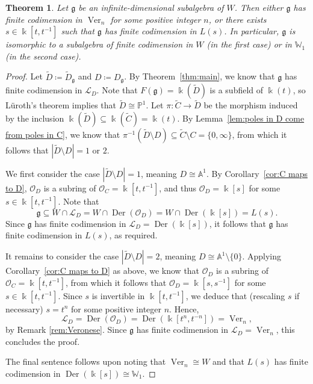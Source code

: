 \documentclass[12pt]{amsart}
\theoremstyle{plain}
\newtheorem{theorem}{Theorem}[section]
\theoremstyle{definition}
\numberwithin{equation}{section}
\def\g{\mathfrak{g}}
\def\L{\mathcal{L}}
\def\O{\mathcal{O}}
\def\Aa{\mathbb{A}}
\def\PP{\mathbb{P}}
\def\WW{\mathbb{W}}
\def\kk{\Bbbk}
\DeclareMathOperator{\Der}{Der}
\DeclareMathOperator{\Ver}{Ver}
\begin{document}
\begin{theorem}\label{thm:classification up to finite codimension}
    Let $\g$ be an infinite-dimensional subalgebra of $W$. Then either $\g$ has finite codimension in $\Ver_n$ for some positive integer $n$, or there exists $s \in \kk[t,t^{-1}]$ such that $\g$ has finite codimension in $L(s)$. In particular, $\g$ is isomorphic to a subalgebra of finite codimension in $W$ (in the first case) or in $\WW_1$ (in the second case).
\end{theorem}
\begin{proof}
    Let $\widetilde{D} \coloneqq \widetilde{D}_\g$ and $D \coloneqq D_\g$. By Theorem~\ref{thm:main}, we know that $\g$ has finite codimension in $\L_D$. Note that $F(\g) = \kk(\widetilde{D})$ is a subfield of $\kk(t)$, so L\"uroth's theorem implies that $\widetilde{D} \cong \PP^1$. Let $\pi \colon \widetilde{C} \to \widetilde{D}$ be the morphism induced by the inclusion $\kk(\widetilde{D}) \subseteq \kk(\widetilde{C}) = \kk(t)$. By Lemma~\ref{lem:poles in D come from poles in C}, we know that $\pi^{-1}(\widetilde{D} \setminus D) \subseteq \widetilde{C} \setminus C = \{0,\infty\}$, from which it follows that $|\widetilde{D} \setminus D| = 1$ or $2$.
    
    We first consider the case $|\widetilde{D} \setminus D| = 1$, meaning $D \cong \Aa^1$. By Corollary~\ref{cor:C maps to D}, $\O_D$ is a subring of $\O_C = \kk[t,t^{-1}]$, and thus $\O_D = \kk[s]$ for some $s \in \kk[t,t^{-1}]$. Note that
    $$\g \subseteq W \cap \L_D = W \cap \Der(\O_D) = W \cap \Der(\kk[s]) = L(s).$$
    Since $\g$ has finite codimension in $\L_D = \Der(\kk[s])$, it follows that $\g$ has finite codimension in $L(s)$, as required.

    It remains to consider the case $|\widetilde{D} \setminus D| = 2$, meaning $D \cong \Aa^1 \setminus \{0\}$. Applying Corollary~\ref{cor:C maps to D} as above, we know that $\O_D$ is a subring of $\O_C = \kk[t,t^{-1}]$, from which it follows that $\O_D = \kk[s,s^{-1}]$ for some $s \in \kk[t,t^{-1}]$. Since $s$ is invertible in $\kk[t,t^{-1}]$, we deduce that (rescaling $s$ if necessary) $s = t^n$ for some positive integer $n$. Hence,
    $$\L_D = \Der(\O_D) = \Der(\kk[t^n,t^{-n}]) = \Ver_n,$$
    by Remark \ref{rem:Veronese}. Since $\g$ has finite codimension in $\L_D = \Ver_n$, this concludes the proof.

    The final sentence follows upon noting that $\Ver_n \cong W$ and that $L(s)$ has finite codimension in $\Der(\kk[s]) \cong \WW_1$.
\end{proof}
\end{document}
